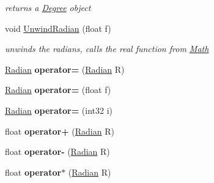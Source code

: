 \begin{DoxyCompactItemize}
\begin{DoxyCompactList}\small\item\em returns a \hyperlink{classrcz_engine_1_1_degree}{Degree} object \end{DoxyCompactList}\item 
\hypertarget{classrcz_engine_1_1_radian_a20b78323fae63c22dcb801b931a6761a}{}void \hyperlink{classrcz_engine_1_1_radian_a20b78323fae63c22dcb801b931a6761a}{Unwind\+Radian} (float f)\label{classrcz_engine_1_1_radian_a20b78323fae63c22dcb801b931a6761a}

\begin{DoxyCompactList}\small\item\em unwinds the radians, calls the real function from \hyperlink{classrcz_engine_1_1_math}{Math} \end{DoxyCompactList}\item 
\hypertarget{classrcz_engine_1_1_radian_ae4c4ea1cb0c142e22161764bc38e9ce8}{}\hyperlink{classrcz_engine_1_1_radian}{Radian} {\bfseries operator=} (\hyperlink{classrcz_engine_1_1_radian}{Radian} R)\label{classrcz_engine_1_1_radian_ae4c4ea1cb0c142e22161764bc38e9ce8}

\item 
\hypertarget{classrcz_engine_1_1_radian_a0d76a2be0afbc0535d64875afe0984f9}{}\hyperlink{classrcz_engine_1_1_radian}{Radian} {\bfseries operator=} (float f)\label{classrcz_engine_1_1_radian_a0d76a2be0afbc0535d64875afe0984f9}

\item 
\hypertarget{classrcz_engine_1_1_radian_aac508bfd1e88dac1f3734f3150d3cc15}{}\hyperlink{classrcz_engine_1_1_radian}{Radian} {\bfseries operator=} (int32 i)\label{classrcz_engine_1_1_radian_aac508bfd1e88dac1f3734f3150d3cc15}

\item 
\hypertarget{classrcz_engine_1_1_radian_a12e107f6340d159ef874b70c826066f3}{}float {\bfseries operator+} (\hyperlink{classrcz_engine_1_1_radian}{Radian} R)\label{classrcz_engine_1_1_radian_a12e107f6340d159ef874b70c826066f3}

\item 
\hypertarget{classrcz_engine_1_1_radian_a9f3be09154a23fcc9605e9da167472e9}{}float {\bfseries operator-\/} (\hyperlink{classrcz_engine_1_1_radian}{Radian} R)\label{classrcz_engine_1_1_radian_a9f3be09154a23fcc9605e9da167472e9}

\item 
\hypertarget{classrcz_engine_1_1_radian_a18613bee68e7264cc7da45dc2c2cda6c}{}float {\bfseries operator$\ast$} (\hyperlink{classrcz_engine_1_1_radian}{Radian} R)\label{classrcz_engine_1_1_radian_a18613bee68e7264cc7da45dc2c2cda6c}


\end{DoxyCompactItemize}
